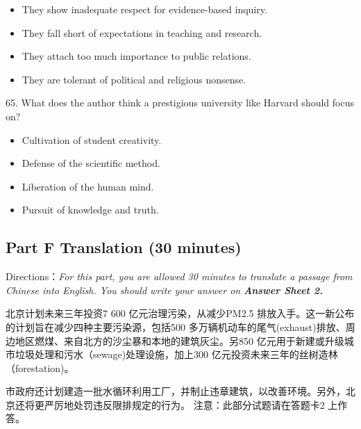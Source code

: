 \documentclass[UTF8,11pt]{ctexart}
\begin{document}
\begin{itemize}[leftmargin=2em,itemsep=.2em,topsep=.4em]\item[A.] They show inadequate respect for evidence-based inquiry.
\item[B.] They fall short of expectations in teaching and research.
\item[C.] They attach too much importance to public relations.
\item[D.] They are tolerant of political and religious nonsense.
\end{itemize}

65. What does the author think a prestigious university like Harvard should focus on?


\begin{itemize}[leftmargin=2em,itemsep=.2em,topsep=.4em]\item[A.] Cultivation of student creativity.
\item[B.] Defense of the scientific method.
\item[C.] Liberation of the human mind.
\item[D.] Pursuit of knowledge and truth.
\end{itemize}

\subsection*{\textbf{Part F} \textbf{Translation} \textbf{(30 minutes)}}


Directions：\textit{For this part, you are allowed 30 minutes to translate a passage from Chinese into English. You should write} \textit{your answer on}\textbf{\textit{ Answer Sheet 2.}}


北京计划未来三年投资7 600 亿元治理污染，从减少PM2.5 排放入手。这一新公布的计划旨在减少四种主要污染源，包括500 多万辆机动车的尾气(exhaust)排放、周边地区燃煤、来自北方的沙尘暴和本地的建筑灰尘。另850 亿元用于新建或升级城市垃圾处理和污水（sewage)处理设施，加上300 亿元投资未来三年的丝树造林（forestation)。


市政府还计划建造一批水循环利用工厂，并制止违章建筑，以改善环境。另外，北京还将更严厉地处罚违反限排规定的行为。 注意：此部分试题请在答题卡2 上作答。
\end{document}
